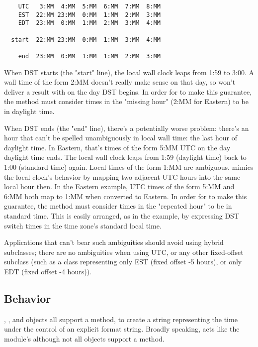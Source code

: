 \begin{verbatim}
    UTC   3:MM  4:MM  5:MM  6:MM  7:MM  8:MM
    EST  22:MM 23:MM  0:MM  1:MM  2:MM  3:MM
    EDT  23:MM  0:MM  1:MM  2:MM  3:MM  4:MM

  start  22:MM 23:MM  0:MM  1:MM  3:MM  4:MM

    end  23:MM  0:MM  1:MM  1:MM  2:MM  3:MM
\end{verbatim}

When DST starts (the "start" line), the local wall clock leaps from 1:59
to 3:00.  A wall time of the form 2:MM doesn't really make sense on that
day, so  won't deliver a result with
 on the
day DST begins.  In order for  to make this
guarantee, the  method must consider times
in the "missing hour" (2:MM for Eastern) to be in daylight time.

When DST ends (the "end" line), there's a potentially worse problem:
there's an hour that can't be spelled unambiguously in local wall time:
the last hour of daylight time.  In Eastern, that's times of
the form 5:MM UTC on the day daylight time ends.  The local wall clock
leaps from 1:59 (daylight time) back to 1:00 (standard time) again.
Local times of the form 1:MM are ambiguous.   mimics
the local clock's behavior by mapping two adjacent UTC hours into the
same local hour then.  In the Eastern example, UTC times of the form
5:MM and 6:MM both map to 1:MM when converted to Eastern.  In order for
 to make this guarantee, the 
method must consider times in the "repeated hour" to be in
standard time.  This is easily arranged, as in the example, by expressing
DST switch times in the time zone's standard local time.

Applications that can't bear such ambiguities should avoid using hybrid
 subclasses; there are no ambiguities when using UTC, or
any other fixed-offset  subclass (such as a class
representing only EST (fixed offset -5 hours), or only EDT (fixed offset
-4 hours)).


\subsection{ Behavior}

, , and 
objects all support a 
method, to create a string representing the time under the control of
an explicit format string.  Broadly speaking,
acts like the  module's
although not all objects support a  method.

